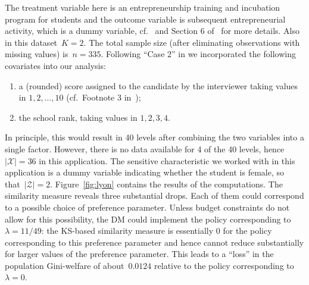 \documentclass[11pt, a4paper]{article}
\theoremstyle{definition}
\begin{document}
The treatment variable here is an entrepreneurship training and incubation program for students and the outcome variable is subsequent entrepreneurial activity, which is a dummy variable, cf.~\cite{lyonszhang} and Section 6 of~\cite{vivbra} for more details. Also in this dataset~$K = 2$. The total sample size (after eliminating observations with missing values) is~$n = 335$. Following ``Case 2'' in \cite{vivbra} we incorporated the following covariates into our analysis:
%
\begin{enumerate}
\item a (rounded) score assigned to the candidate by
the interviewer taking values in $1, 2, \hdots, 10$ (cf.~Footnote 3 in~\cite{lyonszhang});
\item the school rank, taking values in $1, 2, 3, 4$.
\end{enumerate}  
%
In principle, this would result in 40 levels after combining the two variables into a single factor. However, there is no data available for 4 of the 40 levels, hence~$|\mathcal{X}| = 36$ in this application. The sensitive characteristic we worked with in this application is a dummy variable indicating whether the student is female, so that~$|\mathcal{Z}| = 2$. Figure~\ref{fig:lyon} contains the results of the computations. The similarity measure reveals three substantial drops. Each of them could correspond to a possible choice of preference parameter. Unless budget constraints do not allow for this possibility, the DM could implement the policy corresponding to~$\lambda = 11/49$: the KS-based similarity measure is essentially $0$ for the policy corresponding to this preference parameter and hence cannot reduce substantially for larger values of the preference parameter. This leads to a ``loss'' in the population Gini-welfare of about~$0.0124$ relative to the policy corresponding to~$\lambda = 0$. 
\end{document}
